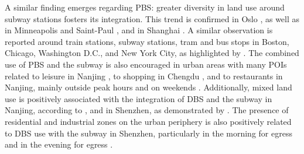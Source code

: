 \begin{refsegment}
A similar finding emerges regarding \acrshort{PBS}: greater diversity in land use around subway stations fosters its integration. This trend is confirmed in Oslo \textcolor{blue}{\autocite[395]{bocker_bike_2020}}, as well as in Minneapolis and Saint-Paul \textcolor{blue}{\autocite[8]{song_investigating_2020}}, and in Shanghai \textcolor{blue}{\autocite[10]{yu_policy_2021}}. A similar observation is reported around train stations, subway stations, tram and bus stops in Boston, Chicago, Washington D.C., and New York City, as highlighted by \textcolor{blue}{\textcite[16]{kong_deciphering_2020}}. The combined use of \acrshort{PBS} and the subway is also encouraged in urban areas with many \acrfull{POIs} related to leisure in Nanjing \textcolor{blue}{\autocite[15-17]{ji_exploring_2018}}, to shopping in Chengdu \textcolor{blue}{\autocite[889]{bi_analysis_2021}}, and to restaurants in Nanjing, mainly outside peak hours and on weekends \textcolor{blue}{\autocite[11-13]{chen_what_2022}}. Additionally, mixed land use is positively associated with the integration of \acrshort{DBS} and the subway in Nanjing, according to \textcolor{blue}{\textcite[12]{liu_use_2020}}, and in Shenzhen, as demonstrated by \textcolor{blue}{\textcite[6]{wang_relationship_2020}}. The presence of residential and industrial zones on the urban periphery is also positively related to \acrshort{DBS} use with the subway in Shenzhen, particularly in the morning for egress and in the evening for egress \textcolor{blue}{\autocites[10]{guo_built_2020}[389]{guo_role_2021}}.%


\end{refsegment}
